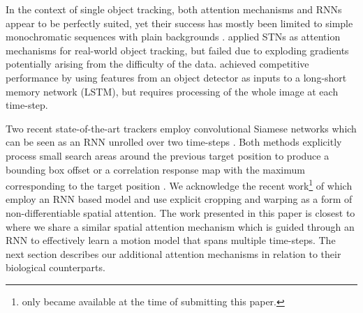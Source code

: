 In the context of single object tracking, both attention mechanisms and RNNs appear to be perfectly suited, yet their success has mostly been limited to simple monochromatic sequences with plain backgrounds \cite{Kahou2015ratm}. \citet{Cheung2016gtc} applied STNs \cite{Jaderberg2015} as attention mechanisms for real-world object tracking, but failed due to exploding gradients potentially arising from the difficulty of the data.
\citet{Ning2016} achieved competitive performance by using features from an object detector as inputs to a long-short memory network (LSTM), but requires processing of the whole image at each time-step. 

Two recent state-of-the-art trackers employ convolutional Siamese networks which can be seen as an RNN unrolled over two time-steps \cite{Held2016goturn, Valmadre2017}. Both methods explicitly process small search areas around the previous target position to produce a bounding box offset \cite{Held2016goturn} or a correlation response map with the maximum corresponding to the target position \cite{Valmadre2017}. 
We acknowledge the recent work\footnote{\cite{Gordon2018re3} only became available at the time of submitting this paper.} of \citet{Gordon2018re3} which employ an RNN based model and use explicit cropping and warping as a form of non-differentiable spatial attention.
The work presented in this paper is closest to \cite{Kahou2015ratm} where we share a similar spatial attention mechanism which is guided through an RNN to effectively learn a motion model that spans multiple time-steps. The next section describes our additional attention mechanisms in relation to their biological counterparts.



    
    
